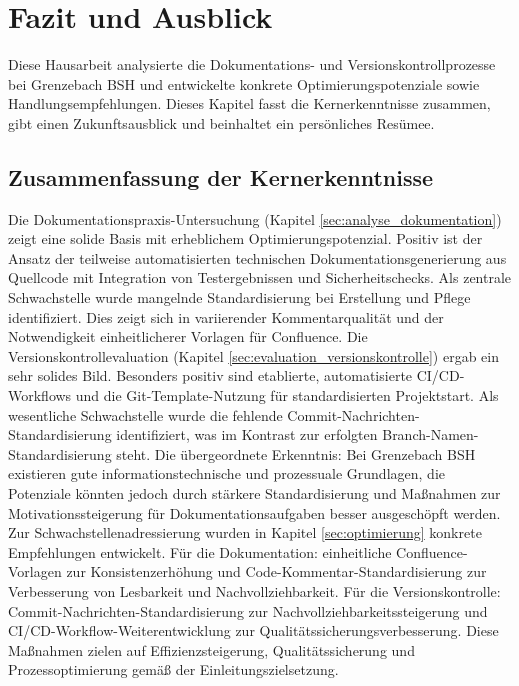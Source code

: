 \documentclass[12pt,oneside]{article}
\begin{document}


    \section{Fazit und Ausblick}
    \label{sec:fazit}
    Diese Hausarbeit analysierte die Dokumentations- und Versionskontrollprozesse bei Grenzebach BSH und entwickelte konkrete Optimierungspotenziale sowie Handlungsempfehlungen. Dieses Kapitel fasst die Kernerkenntnisse zusammen, gibt einen Zukunftsausblick und beinhaltet ein persönliches Resümee.

    \subsection{Zusammenfassung der Kernerkenntnisse}
    \label{subsec:zusammenfassung}
    Die Dokumentationspraxis-Untersuchung (Kapitel \ref{sec:analyse_dokumentation}) zeigt eine solide Basis mit erheblichem Optimierungspotenzial. Positiv ist der Ansatz der teilweise automatisierten technischen Dokumentationsgenerierung aus Quellcode mit Integration von Testergebnissen und Sicherheitschecks. Als zentrale Schwachstelle wurde mangelnde Standardisierung bei Erstellung und Pflege identifiziert. Dies zeigt sich in variierender Kommentarqualität und der Notwendigkeit einheitlicherer Vorlagen für Confluence.
    \newline
    Die Versionskontrollevaluation (Kapitel \ref{sec:evaluation_versionskontrolle}) ergab ein sehr solides Bild. Besonders positiv sind etablierte, automatisierte CI/CD-Workflows und die Git-Template-Nutzung für standardisierten Projektstart. Als wesentliche Schwachstelle wurde die fehlende Commit-Nachrichten-Standardisierung identifiziert, was im Kontrast zur erfolgten Branch-Namen-Standardisierung steht.
    \newline
    Die übergeordnete Erkenntnis: Bei Grenzebach BSH existieren gute informationstechnische und prozessuale Grundlagen, die Potenziale könnten jedoch durch stärkere Standardisierung und Maßnahmen zur Motivationssteigerung für Dokumentationsaufgaben besser ausgeschöpft werden.
    \newline
    Zur Schwachstellenadressierung wurden in Kapitel \ref{sec:optimierung} konkrete Empfehlungen entwickelt. Für die Dokumentation: einheitliche Confluence-Vorlagen zur Konsistenzerhöhung und Code-Kommentar-Standardisierung zur Verbesserung von Lesbarkeit und Nachvollziehbarkeit. Für die Versionskontrolle: Commit-Nachrichten-Standardisierung zur Nachvollziehbarkeitssteigerung und CI/CD-Workflow-Weiterentwicklung zur Qualitätssicherungsverbesserung. Diese Maßnahmen zielen auf Effizienzsteigerung, Qualitätssicherung und Prozessoptimierung gemäß der Einleitungszielsetzung.
\end{document}

